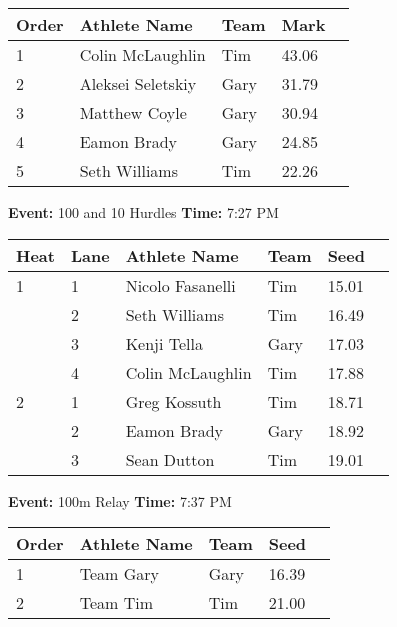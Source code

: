 \documentclass[10pt]{article}
\begin{document}
\vspace{1em}
\begin{tabular}{@{}lllll@{}}
\toprule

\textbf{Order} & \textbf{Athlete Name} & \textbf{Team} & \textbf{Mark} \\
\midrule
1 & Colin McLaughlin & Tim & 43.06 &\\
2 & Aleksei Seletskiy & Gary & 31.79 &\\
3 & Matthew Coyle & Gary & 30.94 &\\
4 & Eamon Brady & Gary & 24.85 &\\
5 & Seth Williams & Tim & 22.26 &\\
\bottomrule
\end{tabular}
\vspace{2.5em}


\textbf{Event:} 100 and 10 Hurdles \quad \textbf{Time:} 7:27 PM 

\vspace{1em}
\begin{tabular}{@{}llllll@{}}
\toprule
\textbf{{Heat}} &
\textbf{Lane} & \textbf{Athlete Name} & \textbf{Team} & \textbf{Seed} \\
\midrule
1 & 1 & Nicolo Fasanelli & Tim & 15.01 &\\
 & 2 & Seth Williams & Tim & 16.49 &\\
 & 3 & Kenji Tella & Gary & 17.03 &\\
 & 4 & Colin McLaughlin & Tim & 17.88 &\\
2 & 1 & Greg Kossuth & Tim & 18.71 &\\
 & 2 & Eamon Brady & Gary & 18.92 &\\
 & 3 & Sean Dutton & Tim & 19.01 &\\
\bottomrule
\end{tabular}
\vspace{2.5em}


\textbf{Event:} 100m Relay \quad \textbf{Time:} 7:37 PM 

\vspace{1em}
\begin{tabular}{@{}lllll@{}}
\toprule

\textbf{Order} & \textbf{Athlete Name} & \textbf{Team} & \textbf{Seed} \\
\midrule
1 & Team Gary & Gary & 16.39 &\\
2 & Team Tim & Tim & 21.00 &\\
\bottomrule
\end{tabular}
\vspace{2.5em}
\end{document}
